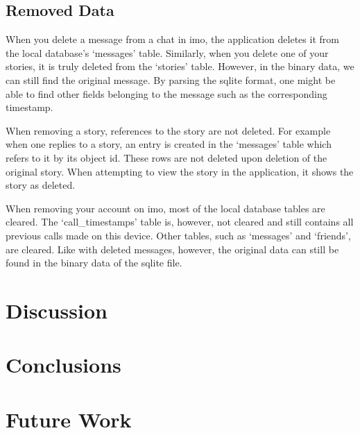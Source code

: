 \documentclass[conference]{IEEEtran}
\begin{document}
\subsection{Removed Data}

When you delete a message from a chat in imo, the application deletes it from
the local database's `messages' table. Similarly, when you delete one of your
stories, it is truly deleted from the `stories' table. However, in the binary
data, we can still find the original message. By parsing the sqlite format, one
might be able to find other fields belonging to the message such as the
corresponding timestamp.

When removing a story, references to the story are not deleted. For example
when one replies to a story, an entry is created in the `messages' table which
refers to it by its object id. These rows are not deleted upon deletion of the
original story. When attempting to view the story in the application, it shows
the story as deleted.

When removing your account on imo, most of the local database tables are
cleared. The `call\_timestamps' table is, however, not cleared and still
contains all previous calls made on this device. Other tables, such as
`messages' and `friends', are cleared. Like with deleted messages, however, the
original data can still be found in the binary data of the sqlite file.

\section{Discussion}

\section{Conclusions}

\section{Future Work}


%
\end{document}

